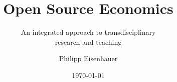 
\title{Open Source Economics}
\subtitle{An integrated approach to transdisciplinary \\ research and teaching}
\author{Philipp Eisenhauer}
\date{\today}

\begin{frame}[standout]{~}\titlepage\end{frame}
